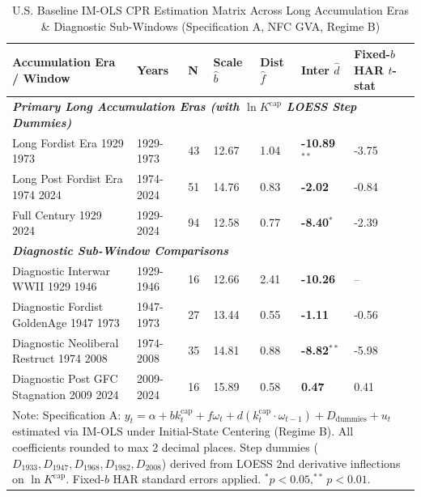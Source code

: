 \begin{table}[h!]
\centering
\small
\caption{U.S. Baseline IM-OLS CPR Estimation Matrix Across Long Accumulation Eras \& Diagnostic Sub-Windows (Specification A, NFC GVA, Regime B)}
\label{tab:baseline_imols_windows_matrix}
\begin{tabular}{p{4.5cm} p{1.3cm} p{0.6cm} p{1.6cm} p{1.6cm} p{2.2cm} p{1.8cm}}
\toprule
\textbf{Accumulation Era / Window} & \textbf{Years} & \textbf{N} & \textbf{Scale $\hat{b}$} & \textbf{Dist $\hat{f}$} & \textbf{Inter $\hat{d}$} & \textbf{Fixed-$b$ HAR $t$-stat} \\
\midrule
\multicolumn{7}{l}{\textbf{\textit{Primary Long Accumulation Eras (with $\ln K^{\text{cap}}$ LOESS Step Dummies)}} } \\
Long Fordist Era 1929 1973 & 1929-1973 & 43 & 12.67 & 1.04 & \textbf{-10.89}$^{**}$ & -3.75 \\
Long Post Fordist Era 1974 2024 & 1974-2024 & 51 & 14.76 & 0.83 & \textbf{-2.02} & -0.84 \\
Full Century 1929 2024 & 1929-2024 & 94 & 12.58 & 0.77 & \textbf{-8.40}$^{*}$ & -2.39 \\
\midrule
\multicolumn{7}{l}{\textbf{\textit{Diagnostic Sub-Window Comparisons}} } \\
Diagnostic Interwar WWII 1929 1946 & 1929-1946 & 16 & 12.66 & 2.41 & \textbf{-10.26} & -- \\
Diagnostic Fordist GoldenAge 1947 1973 & 1947-1973 & 27 & 13.44 & 0.55 & \textbf{-1.11} & -0.56 \\
Diagnostic Neoliberal Restruct 1974 2008 & 1974-2008 & 35 & 14.81 & 0.88 & \textbf{-8.82}$^{**}$ & -5.98 \\
Diagnostic Post GFC Stagnation 2009 2024 & 2009-2024 & 16 & 15.89 & 0.58 & \textbf{0.47} & 0.41 \\
\bottomrule
\multicolumn{7}{p{15.2cm}}{\footnotesize Note: Specification A: $y_t = \alpha + b k^{\text{cap}}_t + f \omega_t + d (k^{\text{cap}}_t \cdot \omega_{t-1}) + D_{\text{dummies}} + u_t$ estimated via IM-OLS under Initial-State Centering (Regime B). All coefficients rounded to max 2 decimal places. Step dummies ($D_{1933}, D_{1947}, D_{1968}, D_{1982}, D_{2008}$) derived from LOESS 2nd derivative inflections on $\ln K^{\text{cap}}$. Fixed-$b$ HAR standard errors applied. $^*p<0.05, ^{**}p<0.01$.}
\end{tabular}
\end{table}

